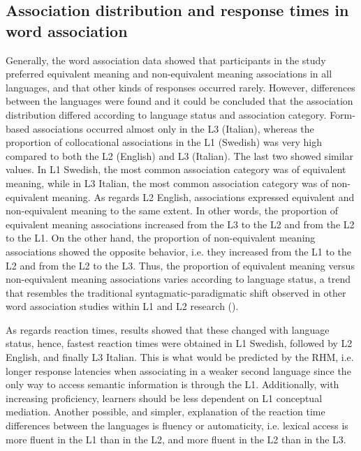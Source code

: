\documentclass[output=paper,colorlinks,citecolor=brown,nonflat]{langsci/langscibook}
\begin{document}
\subsection{Association distribution and response times in word association}\label{sec:gudmundson:4.1}

Generally, the word association data showed that participants in the study preferred equivalent meaning and non-equivalent meaning associations in all languages, and that other kinds of responses occurred rarely. However, differences between the languages were found and it could be concluded that the association distribution differed according to language status and association category. Form-based associations occurred almost only in the L3 (Italian), whereas the proportion of collocational associations in the L1 (Swedish) was very high compared to both the L2 (English) and L3 (Italian). The last two showed similar values. In L1 Swedish, the most common association category was of equivalent meaning, while in L3 Italian, the most common association category was of non-equivalent meaning. As regards L2 English, associations expressed equivalent and non-equivalent meaning to the same extent. In other words, the proportion of equivalent meaning associations increased from the L3 to the L2 and from the L2 to the L1. On the other hand, the proportion of non-equivalent meaning associations showed the opposite behavior, i.e. they increased from the L1 to the L2 and from the L2 to the L3. Thus, the proportion of equivalent meaning versus non-equivalent meaning associations varies according to language status, a trend that resembles the traditional syntagmatic-paradigmatic shift observed in other word association studies within L1 and L2 research (\citealt{Ervin1961, EntwisleEtAl1964, Meara1978, Politzer1978, FitzpatrickIzura2011, KhazaeenezhadAlibabaee2013}).

As regards reaction times, results showed that these changed with language status, hence, fastest reaction times were obtained in L1 Swedish, followed by L2 English, and finally L3 Italian. This is what would be predicted by the RHM, i.e. longer response latencies when associating in a weaker second language since the only way to access semantic information is through the L1. Additionally, with increasing proficiency, learners should be less dependent on L1 conceptual mediation. Another possible, and simpler, explanation of the reaction time differences between the languages is fluency or automaticity, i.e. lexical access is more fluent in the L1 than in the L2, and more fluent in the L2 than in the L3.\largerpage
\end{document}

